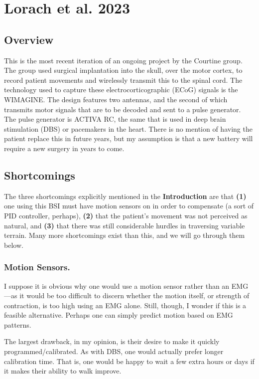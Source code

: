 \section{Lorach et al. 2023} 
\subsection{Overview} This is the most recent iteration of an ongoing project by the Courtine group. The group used surgical implantation into the skull, over the motor cortex, to record patient movements and wirelessly transmit this to the spinal cord. The technology used to capture these electrocorticographic (ECoG) signals is the WIMAGINE. The design features two antennas, and the second of which transmits motor signals that are to be decoded and sent to a pulse generator. The pulse generator is ACTIVA RC, the same that is used in deep brain stimulation (DBS) or pacemakers in the heart. There is no mention of having the patient replace this in future years, but my assumption is that a new battery will require a new surgery in years to come. 


\subsection{Shortcomings} The three shortcomings explicitly mentioned in the \textbf{Introduction} are that \textbf{(1)} one using this BSI must have motion sensors on in order to compensate (a sort of PID controller, perhaps),  \textbf{(2)} that the patient's movement was not perceived as natural, and \textbf{(3)} that there was still considerable hurdles in traversing variable terrain. Many more shortcomings exist than this, and we will go through them below.

\subsubsection{Motion Sensors.} I suppose it is obvious why one would use a motion sensor rather than an EMG---as it would be too difficult to discern whether the motion itself, or strength of contraction, is too high using an EMG alone. Still, though, I wonder if this is a feasible alternative. Perhaps one can simply predict motion based on EMG patterns.\newline

The largest drawback, in my opinion, is their desire to make it quickly programmed/calibrated. As with DBS, one would actually prefer longer calibration time. That is, one would be happy to wait a few extra hours or days if it makes their ability to walk improve.\newline

